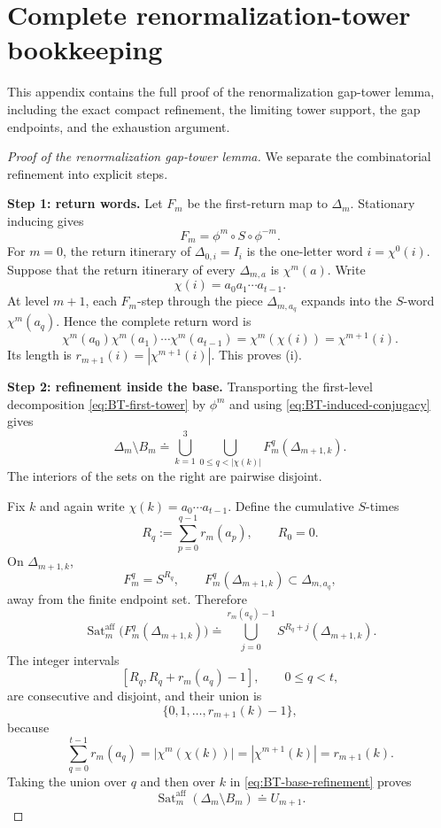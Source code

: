 \documentclass[11pt]{amsart}
\theoremstyle{plain}
\theoremstyle{definition}
\theoremstyle{remark}
\begin{document}
\section{Complete renormalization-tower bookkeeping}
\label{app:gap-tower-details}

This appendix contains the full proof of the renormalization gap-tower lemma,
including the exact compact refinement, the limiting tower support, the gap
endpoints, and the exhaustion argument.

\begin{proof}[Proof of the renormalization gap-tower lemma]
We separate the combinatorial refinement into explicit steps.

\smallskip
\noindent
\textbf{Step 1: return words.}
Let \(F_m\) be the first-return map to \(\Delta_m\). Stationary inducing gives
\[
        F_m=\phi^m\circ S\circ\phi^{-m}.
\tag{C.1}
\label{eq:BT-induced-conjugacy}
\]
For \(m=0\), the return itinerary of \(\Delta_{0,i}=I_i\) is the one-letter word
\(i=\chi^0(i)\). Suppose that the return itinerary of every \(\Delta_{m,a}\) is
\(\chi^m(a)\). Write
\[
        \chi(i)=a_0a_1\cdots a_{t-1}.
\]
At level \(m+1\), each \(F_m\)-step through the piece \(\Delta_{m,a_q}\) expands into the
\(S\)-word \(\chi^m(a_q)\). Hence the complete return word is
\[
        \chi^m(a_0)\chi^m(a_1)\cdots\chi^m(a_{t-1})
        =
        \chi^m(\chi(i))
        =
        \chi^{m+1}(i).
\]
Its length is \(r_{m+1}(i)=|\chi^{m+1}(i)|\). This proves \textup{(i)}.

\smallskip
\noindent
\textbf{Step 2: refinement inside the base.}
Transporting the first-level decomposition \eqref{eq:BT-first-tower} by \(\phi^m\) and using
\eqref{eq:BT-induced-conjugacy} gives
\[
\Delta_m\setminus B_m
\doteq
\bigcup_{k=1}^{3}
\bigcup_{0\leq q<|\chi(k)|}
F_m^q(\Delta_{m+1,k}).
\tag{C.2}
\label{eq:BT-base-refinement}
\]
The interiors of the sets on the right are pairwise disjoint.

Fix \(k\) and again write \(\chi(k)=a_0\cdots a_{t-1}\). Define the cumulative
\(S\)-times
\[
        R_q:=\sum_{p=0}^{q-1}r_m(a_p),
        \qquad R_0=0.
\]
On \(\Delta_{m+1,k}\),
\[
        F_m^q=S^{R_q},
        \qquad
        F_m^q(\Delta_{m+1,k})\subset\Delta_{m,a_q},
\]
away from the finite endpoint set. Therefore
\[
\operatorname{Sat}^{\mathrm{aff}}_m
\bigl(F_m^q(\Delta_{m+1,k})\bigr)
\doteq
\bigcup_{j=0}^{r_m(a_q)-1}
S^{R_q+j}(\Delta_{m+1,k}).
\]
The integer intervals
\[
        [R_q,R_q+r_m(a_q)-1],
        \qquad 0\leq q<t,
\]
are consecutive and disjoint, and their union is
\[
        \{0,1,\ldots,r_{m+1}(k)-1\},
\]
because
\[
\sum_{q=0}^{t-1}r_m(a_q)
=
|\chi^m(\chi(k))|
=
|\chi^{m+1}(k)|
=
r_{m+1}(k).
\]
Taking the union over \(q\) and then over \(k\) in
\eqref{eq:BT-base-refinement} proves
\[
        \operatorname{Sat}^{\mathrm{aff}}_m(\Delta_m\setminus B_m)
        \doteq U_{m+1}.
\tag{C.3}
\label{eq:BT-retained-saturation}
\]


\end{proof}
\end{document}
